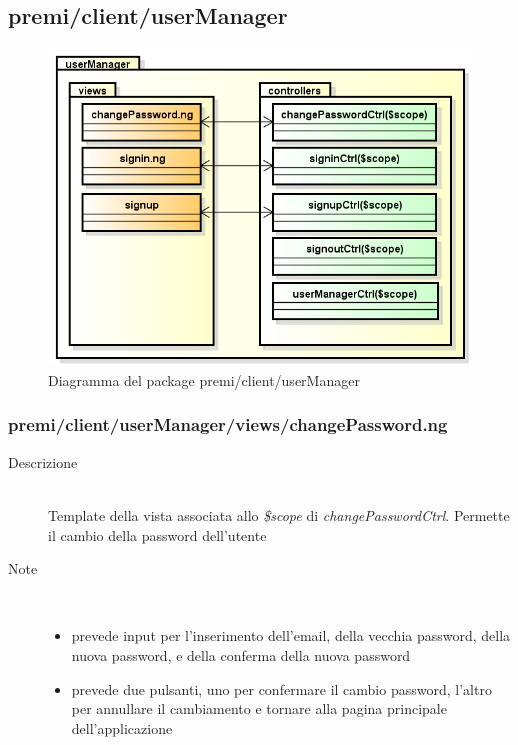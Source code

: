\clearpage
\subsection{premi/client/userManager}
\begin{figure}[h]
\begin{center}
\includegraphics[scale=0.50]{img/diapkg/userManager.png}
\caption{Diagramma del package premi/client/userManager}
\end{center}
\end{figure}



\subsubsection{premi/client/userManager/views/changePassword.ng}

\begin{description}
\item[Descrizione] \hfill \\
	Template della vista associata allo \textit{\$scope} di \textit{changePasswordCtrl}. Permette il cambio della password dell'utente
\item[Note] \hfill \\
	\begin{itemize}
			\item prevede input per l'inserimento dell'email, della vecchia password, della nuova password, e della conferma della nuova password
			\item prevede due pulsanti, uno per confermare il cambio password, l'altro per annullare il cambiamento e tornare alla pagina principale dell'applicazione
	\end{itemize}
\end{description}

